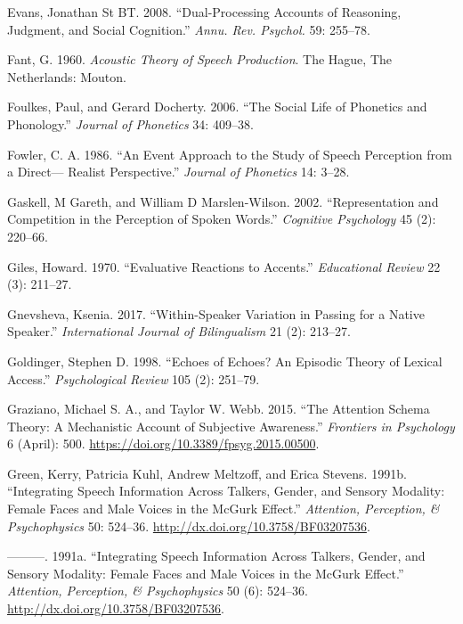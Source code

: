 \documentclass[
  letterpaper,
  DIV=11,
  numbers=noendperiod]{scrartcl}
\newlength{\cslhangindent}
\newenvironment{CSLReferences}[2] %
 {\begin{list}{}{%
  \setlength{\itemindent}{0pt}
  \setlength{\leftmargin}{0pt}
  \setlength{\parsep}{0pt}
  \ifodd #1
   \setlength{\leftmargin}{\cslhangindent}
   \setlength{\itemindent}{-1\cslhangindent}
  \fi
  \setlength{\itemsep}{#2\baselineskip}}}
 {\end{list}}
\begin{document}
\begin{CSLReferences}{1}{0}
Evans, Jonathan St BT. 2008. {``Dual-Processing Accounts of Reasoning,
Judgment, and Social Cognition.''} \emph{Annu. Rev. Psychol.} 59:
255--78.

Fant, G. 1960. \emph{Acoustic Theory of Speech Production}. The Hague,
The Netherlands: Mouton.

Foulkes, Paul, and Gerard Docherty. 2006. {``The Social Life of
Phonetics and Phonology.''} \emph{Journal of Phonetics} 34: 409--38.

Fowler, C. A. 1986. {``An Event Approach to the Study of Speech
Perception from a Direct--- Realist Perspective.''} \emph{Journal of
Phonetics} 14: 3--28.

Gaskell, M Gareth, and William D Marslen-Wilson. 2002. {``Representation
and Competition in the Perception of Spoken Words.''} \emph{Cognitive
Psychology} 45 (2): 220--66.

Giles, Howard. 1970. {``Evaluative Reactions to Accents.''}
\emph{Educational Review} 22 (3): 211--27.

Gnevsheva, Ksenia. 2017. {``Within-Speaker Variation in Passing for a
Native Speaker.''} \emph{International Journal of Bilingualism} 21 (2):
213--27.

Goldinger, Stephen D. 1998. {``Echoes of Echoes? An Episodic Theory of
Lexical Access.''} \emph{Psychological Review} 105 (2): 251--79.

Graziano, Michael S. A., and Taylor W. Webb. 2015. {``The Attention
Schema Theory: A Mechanistic Account of Subjective Awareness.''}
\emph{Frontiers in Psychology} 6 (April): 500.
\url{https://doi.org/10.3389/fpsyg.2015.00500}.

Green, Kerry, Patricia Kuhl, Andrew Meltzoff, and Erica Stevens. 1991b.
{``Integrating Speech Information Across Talkers, Gender, and Sensory
Modality: Female Faces and Male Voices in the McGurk Effect.''}
\emph{Attention, Perception, \& Psychophysics} 50: 524--36.
\url{http://dx.doi.org/10.3758/BF03207536}.

---------. 1991a. {``Integrating Speech Information Across Talkers,
Gender, and Sensory Modality: {Female} Faces and Male Voices in the
{McGurk} Effect.''} \emph{Attention, Perception, \& Psychophysics} 50
(6): 524--36. \url{http://dx.doi.org/10.3758/BF03207536}.


\end{CSLReferences}
\end{document}

